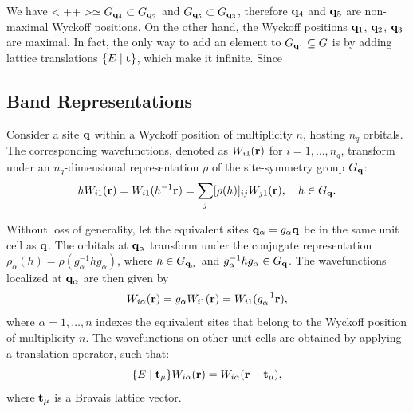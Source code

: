 \begin{example} \label{ex:maximal_wyckpos_example}
We have $<++> \simeq G_{{\vb{q}}_4} \subset G_{{\vb{q}}_2}$ and $G_{{\vb{q}}_5} \subset G_{{\vb{q}}_3}$, therefore ${\vb{q}}_4$ and ${\vb{q}}_5$ are non-maximal Wyckoff positions. On the other hand, the Wyckoff positions ${\vb{q}}_1$, ${\vb{q}}_2$, ${\vb{q}}_3$ are maximal. In fact, the only way to add an element to $G_{{\vb{q}}_1} \subseteq G$ is by adding lattice translations $\{E \mid {\vb{t}}\}$, which make it infinite. Since
\end{example}

\subsection{Band Representations}

Consider a site \({\vb{q}}\) within a Wyckoff position of multiplicity \(n\), hosting \(n_q\) orbitals. The corresponding wavefunctions, denoted as \(W_{i1}({\vb{r}})\) for \(i = 1, \ldots, n_q\), transform under an \(n_q\)-dimensional representation \(\rho\) of the site-symmetry group \(G_{\vb{q}}\):
\begin{equation} \label{eq:gWi1_nq_rep}
h W_{i1}({\vb{r}}) = W_{i1}(h^{-1} {\vb{r}}) = \sum_{j} [\rho(h)]_{ij} W_{j1}({\vb{r}}), \quad h \in G_{\vb{q}}.
\end{equation}

Without loss of generality, let the equivalent sites \({\vb{q}}_\alpha = g_{\alpha} {\vb{q}}\) be in the same unit cell as \({\vb{q}}\). The orbitals at \({\vb{q}}_\alpha\) transform under the conjugate representation \(\rho_\alpha(h) = \rho(g_\alpha^{-1} h g_\alpha)\), where \(h \in G_{{\vb{q}}_\alpha}\) and \(g_\alpha^{-1} h g_\alpha \in G_{\vb{q}}\). The wavefunctions localized at \({\vb{q}}_\alpha\) are then given by
\begin{equation} \label{eq:Wialpha_galpha_action}
W_{i\alpha}({\vb{r}}) = g_\alpha W_{i1}({\vb{r}}) = W_{i1}(g_\alpha^{-1} {\vb{r}}),
\end{equation}
where \(\alpha = 1, \ldots, n\) indexes the equivalent sites that belong to the Wyckoff position of multiplicity \(n\). The wavefunctions on other unit cells are obtained by applying a translation operator, such that:
\begin{equation} \label{eq:translated_Wialpha}
\{ E \mid {\vb{t}}_\mu \} W_{i\alpha}({\vb{r}}) = W_{i\alpha}({\vb{r}}-{\vb{t}}_\mu),
\end{equation}
where ${\vb{t}}_\mu$ is a Bravais lattice vector.

